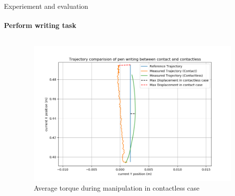 \documentclass[aspectratio=169]{beamer}
\begin{document}
  \begin{frame}{Experiement and evaluation}
    \framesubtitle{Perform writing task}
    \begin{columns}[c]
      \begin{column}{.5\textwidth}
        \begin{table}[H]
          \centering
          \caption{Table of the average displacement, and maximum displacement in contact and contactless case}
          \label{tab:us2_displacement}
          \end{table}
      
      \end{column}
      \begin{column}{.5\textwidth}
        \begin{figure}
          \includegraphics[width=1\textwidth]{images/us2_contactless_traj2.png}
          \caption{Average torque during manipulation in contactless case}
        \end{figure}
      \end{column}
      \end{columns}
  \end{frame}
\end{document}
